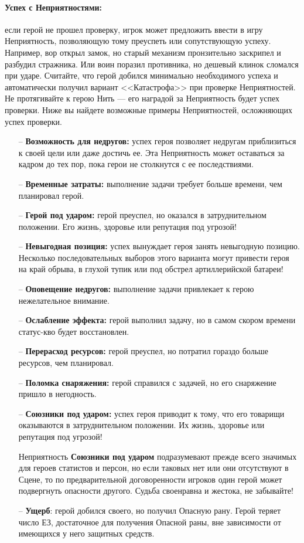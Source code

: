 \paragraph{Успех с Неприятностями:} если герой не прошел проверку, игрок может предложить ввести в игру Неприятность, позволяющую тому преуспеть или сопутствующую успеху. Например, вор открыл замок, но старый механизм пронзительно заскрипел и разбудил стражника. Или воин поразил противника, но дешевый клинок сломался при ударе. Считайте, что герой добился минимально необходимого успеха и автоматически получил вариант <<Катастрофа>> при проверке Неприятностей. Не протягивайте к герою Нить — его наградой за Неприятность будет успех проверки. Ниже вы найдете возможные примеры Неприятностей, осложняющих успех проверки.
\begin{itemize}
\item[--] \textbf{Возможность для недругов:} успех героя позволяет недругам приблизиться к своей цели или даже достичь ее. Эта Неприятность может оставаться за кадром до тех пор, пока герои не столкнутся с ее последствиями.
\item[--] \textbf{Временные затраты:} выполнение задачи требует больше времени, чем планировал герой.
\item[--] \textbf{Герой под ударом:} герой преуспел, но оказался в затруднительном положении. Его жизнь, здоровье или репутация под угрозой!
\item[--] \textbf{Невыгодная позиция:} успех вынуждает героя занять невыгодную позицию. Несколько последовательных выборов этого варианта могут привести героя на край обрыва, в глухой тупик или под обстрел артиллерийской батареи!
\item[--] \textbf{Оповещение недругов:} выполнение задачи привлекает к герою нежелательное внимание.
\item[--] \textbf{Ослабление эффекта:} герой выполнил задачу, но в самом скором времени статус-кво будет восстановлен.
\item[--] \textbf{Перерасход ресурсов:} герой преуспел, но потратил гораздо больше ресурсов, чем планировал.
\item[--] \textbf{Поломка снаряжения:} герой справился с задачей, но его снаряжение пришло в негодность.
\item[--] \textbf{Союзники под ударом:} успех героя приводит к тому, что его товарищи оказываются в затруднительном положении. Их жизнь, здоровье или репутация под угрозой!
\begin{tcolorbox}
Неприятность \textbf{Союзники под ударом} подразумевают прежде всего значимых для героев статистов и персон, но если таковых нет или они отсутствуют в Сцене, то по предварительной договоренности игроков один герой может подвергнуть опасности другого. Судьба своенравна и жестока, не забывайте!
\end{tcolorbox}
\item[--] \textbf{Ущерб}: герой добился своего, но получил Опасную рану. Герой теряет число ЕЗ, достаточное для получения Опасной раны, вне зависимости от имеющихся у него защитных средств.
\end{itemize}
